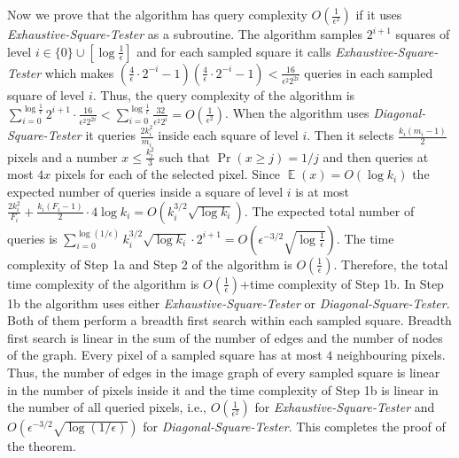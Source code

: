\documentclass[11pt,english]{article}
\numberwithin{figure}{section}
\newcommand{\eps}{{\epsilon}}
\DeclareMathOperator*{\E}{\mathbb E}
\begin{document}
Now we prove that the algorithm has query
complexity $O(\frac{1}{\eps^{2}})$ if it uses \emph{Exhaustive-Square-Tester}
as a subroutine.
The algorithm samples $2^{i+1}$ squares of level
$i\in\{0\}\cup[\log\frac{1}{\eps}]$ and for each sampled square it calls
\emph{Exhaustive-Square-Tester} which makes
$(\frac{4}{\eps}\cdot2^{-i}-1)(\frac{4}{\eps}\cdot2^{-i}-1)<\frac{16}{\eps^{2}2^{2i}}$ queries in each sampled square of level $i$.
Thus, the query complexity of the algorithm is $\sum\nolimits_{i=0}^{\log\frac{1}{\eps}} 2^{i+1}\cdot \frac{16}{\eps^{2}2^{2i}}<\sum\nolimits_{i=0}^{\log\frac{1}{\eps}}\frac{32}{\eps^{2}2^{i}}=O(\frac{1}{\eps^{2}})$.
When the algorithm uses \emph{Diagonal-Square-Tester} it queries
$\frac{2k_{i}^2}{m_{i}}$ inside each square of
level $i$. Then it selects $\frac{k_{i}(m_{i}-1)}{2}$ pixels and a number
$x\leq \frac{k_{i}^{2}}{3}$ such that $\Pr(x\geq j)=1/j$ and then queries at
most $4x$ pixels for each of the selected pixel. Since $\E(x)=O(\log k_{i})$ the
expected number of queries inside a square of level $i$ is at most
$\frac{2k_{i}^2}{F_{i}}+\frac{k_{i}(F_{i}-1)}{2}\cdot 4\log
k_{i}=O(k_{i}^{3/2}\sqrt{\log k_{i}})$. The expected total number of queries is
$\sum\nolimits_{i=0}^{\log(1/\eps)}k_{i}^{3/2}\sqrt{\log
k_{i}}\cdot 2^{i+1}=O(\eps^{-3/2}\sqrt{\log \frac{1}{\eps}})$. The time
complexity of Step 1a and Step 2 of the algorithm is $O(\frac{1}{\eps})$.
Therefore, the total time complexity of the algorithm is
$O(\frac{1}{\eps})$+time complexity of Step 1b. In Step 1b the algorithm
uses either \emph{Exhaustive-Square-Tester} or \emph{Diagonal-Square-Tester}. Both of them perform a breadth first search within each sampled square.
Breadth first search is linear in the sum of the number of edges and the number of nodes of the graph.
Every pixel of a sampled square has at most $4$ neighbouring pixels.
Thus, the number of edges in the image graph of every sampled square is linear in the number of pixels inside it and the time complexity of
Step 1b is linear in the number of all queried pixels, i.e.,
$O(\frac{1}{\eps^{2}})$ for \emph{Exhaustive-Square-Tester} and
$O(\eps^{-3/2}\sqrt{\log (1/\eps)})$ for
\emph{Diagonal-Square-Tester}. This completes the proof of the theorem.
\end{document}
